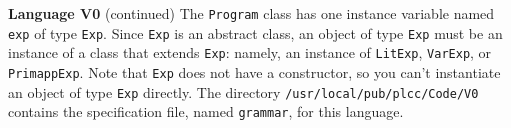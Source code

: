 \begin{minipage}[t]{\sw}
\slidenumber
\LARGE
{\bf Language V0} (continued)\exx
The \verb'Program' class has one instance variable named \verb'exp'
of type \verb'Exp'.
Since \verb'Exp' is an abstract class,
an object of type \verb'Exp' must be an instance of a class
that extends \verb'Exp': namely, an instance
of \verb'LitExp', \verb'VarExp', or \verb'PrimappExp'.
Note that \verb'Exp' does not have a constructor,
so you can't instantiate an object of type \verb'Exp' directly.\exx
The directory \verb'/usr/local/pub/plcc/Code/V0'
contains the specification file, named \verb'grammar', for this language.\exx
\end{minipage}
\clearpage
